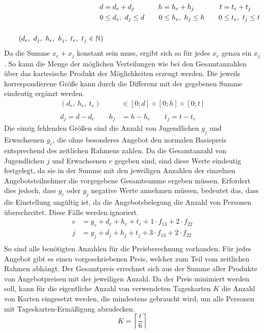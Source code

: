 \documentclass[a4paper, 12pt]{scrartcl}
\begin{document}
\begin{align*}
	d &= d_e + d_j &\quad h &= h_e + h_j &\quad t &= t_e + t_j \\
	0 &\le d_e,\ d_j \le d &\quad 0 &\le h_e,\ h_j \le h &\quad 0 &\le t_e,\ t_j \le t \\\\
	\tag{$d_e,\ d_j,\ h_e,\ h_j,\ t_e,\ t_j \in \mathbb{N}$}
\end{align*}
Da die Summe $x_e + x_j$ konstant sein muss, ergibt sich so für jedes $x_e$ genau ein $x_j$. So kann die Menge der möglichen Verteilungen wie bei den Gesamtanzahlen über das kartesische Produkt der Möglichkeiten erzeugt werden. Die jeweils korrespondierene Größe kann durch die Differenz mit der gegebenen Summe eindeutig ergänzt werden.
\begin{align*}
	(d_e,\ h_e,\ t_e) &\in [0;d] \times [0;h] \times [0;t] \\\\
	d_j = d - d_e \qquad h_j &= h - h_e \qquad t_j = t - t_e
\end{align*}
Die einzig fehlenden Größen sind die Anzahl von Jugendlichen $g_j$ und Erwachsenen $g_e$, die ohne besonderes Angebot den normalen Basispreis entsprechend des zeitlichen Rahmens zahlen. Da die Gesamtanzahl von Jugendlichen $j$ und Erwachsenen $e$ gegeben sind, sind diese Werte eindeutig festgelegt, da sie in der Summe mit den jeweiligen Anzahlen der einzelnen Angebotsteilnehmer die vorgegebene Gesamtsumme ergeben müssen. Erfordert dies jedoch, dass $g_e$ oder $g_j$ negative Werte annehmen müssen, bedeutet das, dass die Einstellung ungültig ist, da die Angebotsbelegung die Anzahl von Personen überschreitet. Diese Fälle werden ignoriert.
\begin{align*}
	e &= g_e + d_e + h_e + t_e + 1 \cdot f_{13} + 2 \cdot f_{22} \\
	j &= g_j + d_j + h_j + t_j + 3 \cdot f_{13} + 2 \cdot f_{22} \\
\end{align*}
So sind alle benötigten Anzahlen für die Preisberechnung vorhanden. Für jedes Angebot gibt es einen vorgeschriebenen Preis, welcher zum Teil vom zeitlichen Rahmen abhängt. Der Gesamtpreis errechnet sich aus der Summe aller Produkte von Angebotpreisen mit der jeweiligen Anzahl. Da der Preis minimiert werden soll, kann für die eigentliche Anzahl von verwendeten Tageskarten $K$ die Anzahl von Karten eingesetzt werden, die mindestens gebraucht wird, um alle Personen mit Tageskarten-Ermäßigung abzudecken.
\[
	K = \left\lceil \frac{t}{6} \right\rceil
\]
\end{document}
